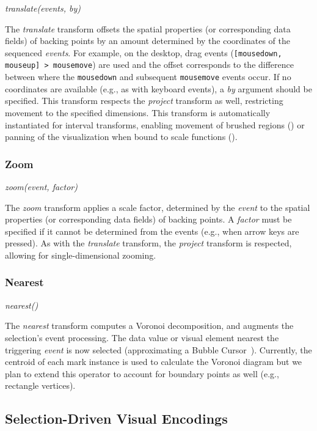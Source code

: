 \centerline{\emph{translate(events, by)}}

The \emph{translate} transform offsets the spatial properties (or corresponding
data fields) of backing points by an amount determined by the coordinates of the
sequenced \emph{events}. For example, on the desktop, drag events
(\texttt{[mousedown, mouseup] > mousemove}) are used and the offset corresponds
to the difference between where the \texttt{mousedown} and subsequent
\texttt{mousemove} events occur. If no coordinates are available (e.g., as with
keyboard events), a \emph{by} argument should be specified. This transform
respects the \emph{project} transform as well, restricting movement to the
specified dimensions. This transform is automatically instantiated for interval
transforms, enabling movement of brushed regions ()
or panning of the visualization when bound to scale functions
().

\subsubsection{Zoom}

\centerline{\emph{zoom(event, factor)}}

The \emph{zoom} transform applies a scale factor, determined by the \emph{event}
to the spatial properties (or corresponding data fields) of backing points. A
\emph{factor} must be specified if it cannot be determined from the events
(e.g., when arrow keys are pressed). As with the \emph{translate} transform, the
\emph{project} transform is respected, allowing for single-dimensional zooming.

\subsubsection{Nearest}

\centerline{\emph{nearest()}}

The \emph{nearest} transform computes a Voronoi decomposition, and augments the
selection's event processing. The data value or visual element nearest the
triggering \emph{event} is now selected (approximating a Bubble
Cursor~\cite{grossman:bubble}). Currently, the centroid of each mark instance is
used to calculate the Voronoi diagram but we plan to extend this operator to
account for boundary points as well (e.g., rectangle vertices).

\subsection{Selection-Driven Visual Encodings}

